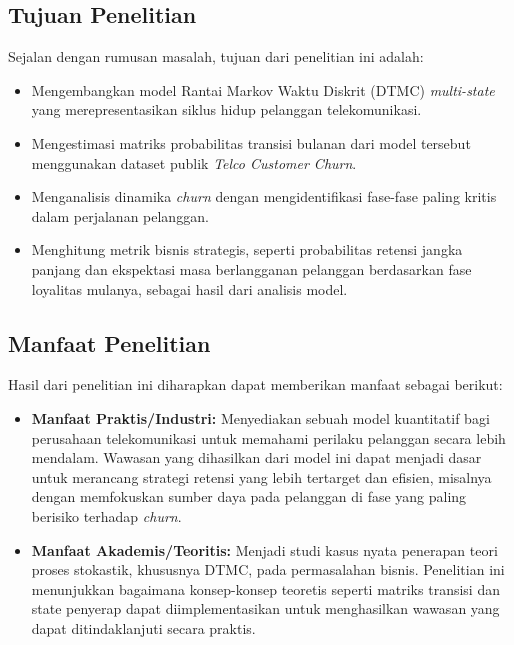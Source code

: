 \documentclass[a4paper,12pt]{article}
\begin{document}
\subsection{Tujuan Penelitian}
Sejalan dengan rumusan masalah, tujuan dari penelitian ini adalah:
\begin{itemize}
    \item Mengembangkan model Rantai Markov Waktu Diskrit (DTMC) \textit{multi-state} yang merepresentasikan siklus hidup pelanggan telekomunikasi.
    \item Mengestimasi matriks probabilitas transisi bulanan dari model tersebut menggunakan dataset publik \textit{Telco Customer Churn}.
    \item Menganalisis dinamika \textit{churn} dengan mengidentifikasi fase-fase paling kritis dalam perjalanan pelanggan.
    \item Menghitung metrik bisnis strategis, seperti probabilitas retensi jangka panjang dan ekspektasi masa berlangganan pelanggan berdasarkan fase loyalitas mulanya, sebagai hasil dari analisis model.
\end{itemize}

\subsection{Manfaat Penelitian}
Hasil dari penelitian ini diharapkan dapat memberikan manfaat sebagai berikut:
\begin{itemize}
    \item \textbf{Manfaat Praktis/Industri:} Menyediakan sebuah model kuantitatif bagi perusahaan telekomunikasi untuk memahami perilaku pelanggan secara lebih mendalam. Wawasan yang dihasilkan dari model ini dapat menjadi dasar untuk merancang strategi retensi yang lebih tertarget dan efisien, misalnya dengan memfokuskan sumber daya pada pelanggan di fase yang paling berisiko terhadap \textit{churn}.
    \item \textbf{Manfaat Akademis/Teoritis:} Menjadi studi kasus nyata penerapan teori proses stokastik, khususnya DTMC, pada permasalahan bisnis. Penelitian ini menunjukkan bagaimana konsep-konsep teoretis seperti matriks transisi dan state penyerap dapat diimplementasikan untuk menghasilkan wawasan yang dapat ditindaklanjuti secara praktis.
\end{itemize}
\end{document}
